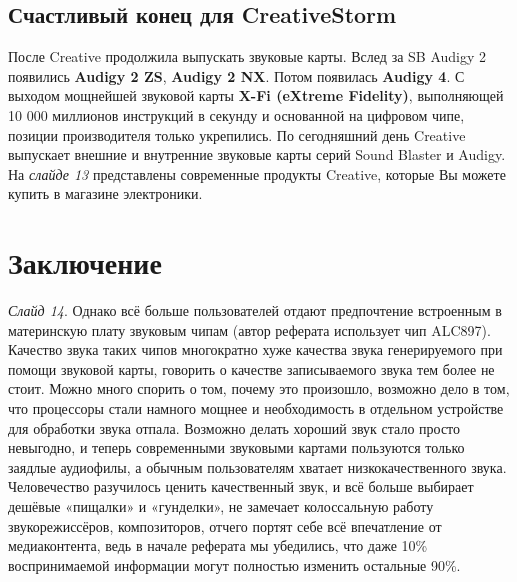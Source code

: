 \documentclass[a4paper,12pt]{extarticle}
\newcommand{\anonsection}[1]{\section*{#1}\addcontentsline{toc}{section}{#1}}
\begin{document}
	\subsection{Счастливый конец для CreativeStorm}
	После Creative продолжила выпускать звуковые карты. Вслед за SB Audigy 2 появились \textbf{Audigy 2 ZS}, \textbf{Audigy 2 NX}. Потом появилась \textbf{Audigy 4}. С выходом мощнейшей звуковой карты \textbf{X-Fi (eXtreme Fidelity)}, выполняющей 10 000 миллионов инструкций в секунду и основанной на цифровом чипе, позиции производителя только укрепились.  По сегодняшний день Creative выпускает внешние и внутренние звуковые карты серий Sound Blaster и Audigy. На \textit{слайде 13} представлены современные продукты Creative, которые Вы можете купить в магазине электроники.
	\newpage
	
	
	\anonsection{Заключение}
	\textit{Слайд 14}. Однако всё больше пользователей отдают предпочтение встроенным в материнскую плату звуковым чипам (автор реферата использует чип ALC897). Качество звука таких чипов многократно хуже качества звука генерируемого при помощи звуковой карты, говорить о качестве записываемого звука тем более не стоит. Можно много спорить о том, почему это произошло, возможно дело в том, что процессоры стали намного мощнее и необходимость в отдельном устройстве для обработки звука отпала. Возможно делать хороший звук стало просто невыгодно, и теперь современными звуковыми картами пользуются только заядлые аудиофилы, а обычным пользователям хватает низкокачественного звука. Человечество разучилось ценить качественный звук, и всё больше выбирает дешёвые «пищалки» и «гунделки», не замечает колоссальную работу звукорежиссёров, композиторов, отчего портят себе всё впечатление от медиаконтента, ведь в начале реферата мы убедились, что даже 10\% воспринимаемой информации могут полностью изменить остальные 90\%.
	\newpage
	
\end{document}
